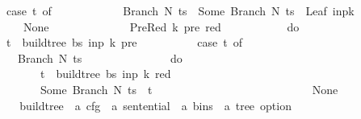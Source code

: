 \begin{isabellebody}
\ \ \ \ \ \ \ \ \ \ case\ t\ of\isanewline
\ \ \ \ \ \ \ \ \ \ \ \ Branch\ N\ ts\ {\isasymRightarrow}\ Some\ {\isacharparenleft}{\kern0pt}Branch\ N\ {\isacharparenleft}{\kern0pt}ts\ {\isacharat}{\kern0pt}\ {\isacharbrackleft}{\kern0pt}Leaf\ {\isacharparenleft}{\kern0pt}inp{\isacharbang}{\kern0pt}{\isacharparenleft}{\kern0pt}k{\isacharminus}{\kern0pt}{}{\isacharparenright}{\kern0pt}{\isacharparenright}{\kern0pt}{\isacharbrackright}{\kern0pt}{\isacharparenright}{\kern0pt}{\isacharparenright}{\kern0pt}\isanewline
\ \ \ \ \ \ \ \ \ \ {\isacharbar}{\kern0pt}\ {\isacharunderscore}{\kern0pt}\ {\isasymRightarrow}\ None\isanewline
\ \ \ \ \ \ \ \ {\isacharbraceright}{\kern0pt}{\isacharparenright}{\kern0pt}\isanewline
\ \ \ \ {\isacharbar}{\kern0pt}\ PreRed\ {\isacharparenleft}{\kern0pt}k{\isacharprime}{\kern0pt}{\isacharcomma}{\kern0pt}\ pre{\isacharcomma}{\kern0pt}\ red{\isacharparenright}{\kern0pt}\ {\isacharunderscore}{\kern0pt}\ {\isasymRightarrow}\ {\isacharparenleft}{\kern0pt}\isanewline
\ \ \ \ \ \ \ \ do\ {\isacharbraceleft}{\kern0pt}\isanewline
\ \ \ \ \ \ \ \ \ \ t\ {\isasymleftarrow}\ build{\isacharunderscore}{\kern0pt}tree{\isacharprime}{\kern0pt}\ bs\ inp\ k{\isacharprime}{\kern0pt}\ pre{\isacharsemicolon}{\kern0pt}\isanewline
\ \ \ \ \ \ \ \ \ \ case\ t\ of\isanewline
\ \ \ \ \ \ \ \ \ \ \ \ Branch\ N\ ts\ {\isasymRightarrow}\isanewline
\ \ \ \ \ \ \ \ \ \ \ \ \ \ do\ {\isacharbraceleft}{\kern0pt}\isanewline
\ \ \ \ \ \ \ \ \ \ \ \ \ \ \ \ t\ {\isasymleftarrow}\ build{\isacharunderscore}{\kern0pt}tree{\isacharprime}{\kern0pt}\ bs\ inp\ k\ red{\isacharsemicolon}{\kern0pt}\isanewline
\ \ \ \ \ \ \ \ \ \ \ \ \ \ \ \ Some\ {\isacharparenleft}{\kern0pt}Branch\ N\ {\isacharparenleft}{\kern0pt}ts\ {\isacharat}{\kern0pt}\ {\isacharbrackleft}{\kern0pt}t{\isacharbrackright}{\kern0pt}{\isacharparenright}{\kern0pt}{\isacharparenright}{\kern0pt}\isanewline
\ \ \ \ \ \ \ \ \ \ \ \ \ \ {\isacharbraceright}{\kern0pt}\isanewline
\ \ \ \ \ \ \ \ \ \ {\isacharbar}{\kern0pt}\ {\isacharunderscore}{\kern0pt}\ {\isasymRightarrow}\ None\isanewline
\ \ \ \ \ \ \ \ {\isacharbraceright}{\kern0pt}{\isacharparenright}{\kern0pt}\isanewline
\ \ {\isacharparenright}{\kern0pt}{\isacharparenright}{\kern0pt}{\isachardoublequoteclose}\isanewline
\isanewline
{}\isamarkupfalse%
\ build{\isacharunderscore}{\kern0pt}tree\ {\isacharcolon}{\kern0pt}{\isacharcolon}{\kern0pt}\ {\isachardoublequoteopen}{\isacharprime}{\kern0pt}a\ cfg\ {\isasymRightarrow}\ {\isacharprime}{\kern0pt}a\ sentential\ {\isasymRightarrow}\ {\isacharprime}{\kern0pt}a\ bins\ {\isasymRightarrow}\ {\isacharprime}{\kern0pt}a\ tree\ option{\isachardoublequoteclose}\ \isanewline

\end{isabellebody}

